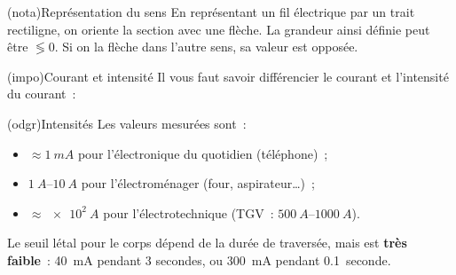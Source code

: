 \documentclass[../../main/main.tex]{subfiles}
\begin{document}
\begin{tcb}[label=nota:intensconv, sidebyside, righthand ratio=.4](nota){Représentation du sens}
	En représentant un fil électrique par un trait rectiligne, on oriente la
	section avec une flèche. La grandeur ainsi définie peut être $\lessgtr 0$.
	Si on la flèche dans l'autre sens, sa valeur est opposée.
	\tcblower
	\begin{center}
	\end{center}
\end{tcb}
\begin{tcb}[label=impo:courantintensité](impo){Courant et intensité}
	Il vous faut savoir différencier le courant et l'intensité du courant~:
	\smallbreak
	\begin{isd}[cnt]
		\vspace*{-10pt}
		\tcblower
		\vspace*{-10pt}
	\end{isd}
\end{tcb}
\begin{tcb}[label=odgr:intensité](odgr){Intensités}
	Les valeurs mesurées sont~:
	\begin{itemize}[label=$\diamond$, leftmargin=10pt]
		\item $\approx \SI{1}{mA}$ pour l'électronique du quotidien
		      (téléphone)~;
		\item $\SIrange{1}{10}{A}$ pour l'électroménager (four,
		      aspirateur…)~;
		\item $\approx \SI{e2}{A}$ pour l'électrotechnique (TGV~:
		      $\SIrange{500}{1000}{A}$).
	\end{itemize}
	Le seuil létal pour le corps dépend de la durée de traversée, mais est
	\textbf{très faible}~: \SI{40}{mA} pendant 3 secondes, ou \SI{300}{mA}
	pendant \SI{0.1}{seconde}.
\end{tcb}
\end{document}
